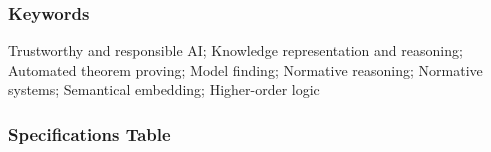 \documentclass{article}
\newcommand{\comment}[1]{
}
\begin{document}
\comment{
[The Abstract should describe the data collection process, the analysis performed, the data, and their reuse potential. It should not provide conclusions or interpretive insights. If your article is being submitted via another Elsevier journal as a co-submission, please cite this research article in the abstract (title, or doi, and reference number only, e.g., “Title” [1]), and point the reader there for interpretation. \\
Min 100 words - Max 500 words] 
}



\subsubsection*{Keywords}
Trustworthy and responsible AI; Knowledge representation and
reasoning; Automated theorem proving; Model finding; Normative
reasoning; Normative systems; %
Semantical embedding; Higher-order logic

\comment{
[Include 4-8 keywords (or phrases) to facilitate others finding your article online. Tip: Try Google Scholar to see what terms are most common in your field. In biomedical fields, MeSH terms are a good ‘common vocabulary’ to draw from]
}



\subsubsection*{Specifications Table} 

\comment{
[Every section of this table is mandatory. Please enter information in the right-hand column and remove all the instructions]
}
\end{document}

